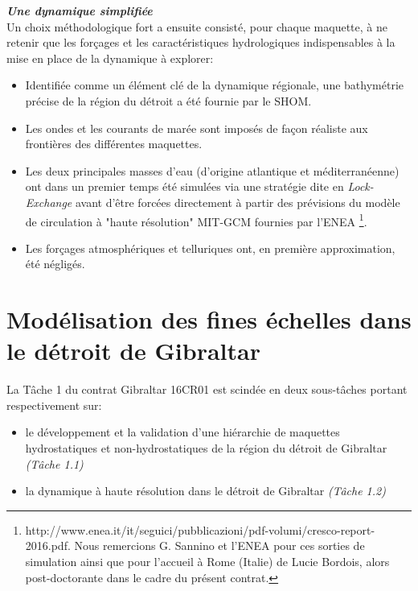 \documentclass[a4paper,11pt]{report}
\begin{document}
\noindent\textit{\textbf{Une dynamique simplifiée}}\\
Un choix méthodologique fort a ensuite consisté, pour chaque maquette, à ne retenir que les forçages et les caractéristiques hydrologiques indispensables à la mise en place de la dynamique à explorer:
\begin{itemize}
\item Identifiée comme un élément clé de la dynamique régionale, une bathymétrie précise de la région du détroit a été fournie par le SHOM.
\item Les ondes et les courants de marée sont imposés de façon réaliste aux frontières des différentes maquettes.
\item Les deux principales masses d'eau (d'origine atlantique et méditerranéenne) ont dans un premier temps été simulées via une stratégie dite en \textit{Lock-Exchange} avant d'être forcées directement à partir des prévisions du modèle de circulation à "haute résolution" MIT-GCM fournies par l'ENEA \footnote{http://www.enea.it/it/seguici/pubblicazioni/pdf-volumi/cresco-report-2016.pdf. Nous remercions G. Sannino et l'ENEA pour ces sorties de simulation ainsi que pour l'accueil à Rome (Italie) de Lucie Bordois, alors post-doctorante dans le cadre du présent contrat.}.
\item Les forçages atmosphériques et telluriques ont, en première approximation, été négligés.
\end{itemize}

\chapter{Modélisation des fines échelles dans le détroit de Gibraltar\\}
\label{chapitremodele}

La Tâche 1 du contrat Gibraltar 16CR01 est scindée en deux sous-tâches portant respectivement sur:
\begin{itemize}
\item{le développement et la validation d’une hiérarchie de maquettes hydrostatiques et non-hydrostatiques de la région du détroit de Gibraltar \textit{(Tâche 1.1)}}
\item{la dynamique à haute résolution dans le détroit de Gibraltar \textit{(Tâche 1.2)}}
\end{itemize}
\end{document}
